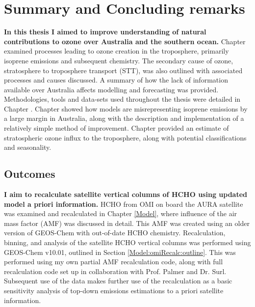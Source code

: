 \chapter{Summary and Concluding remarks} %
\label{Conclusions}

  \textbf{In this thesis I aimed to improve understanding of natural contributions to ozone over Australia and the southern ocean.}
  Chapter  examined processes leading to ozone creation in the troposphere, primarily isoprene emissions and subsequent chemistry.
  The secondary cause of ozone, stratosphere to troposphere transport (STT), was also outlined with associated processes and causes discussed.
  A summary of how the lack of information available over Australia affects modelling and forecasting was provided.
  Methodologies, tools and data-sets used throughout the thesis were detailed in Chapter .
  Chapter  showed how models are misrepresenting isoprene emissions by a large margin in Australia, along with the description and implementation of a relatively simple method of improvement.
  Chapter  provided an estimate of stratospheric ozone influx to the troposphere, along with potential classifications and seasonality.

\section{Outcomes}
\label{Conclusions:aims}
  
  \textbf{I aim to recalculate satellite vertical columns of HCHO using updated model a priori information.}
  HCHO from OMI on board the AURA satellite %
  was examined and recalculated in Chapter \ref{Model}, where influence of the air mass factor (AMF) was discussed in detail. %
  This AMF was created using an older version of GEOS-Chem with out-of-date HCHO chemistry.
  Recalculation, binning, and analysis of the satellite HCHO vertical columns was performed using GEOS-Chem v10.01, outlined in Section \ref{Model:omiRecalc:outline}.
  This was performed using my own partial AMF recalculation code, along with full recalculation code set up in collaboration with Prof. Palmer and Dr. Surl.
  Subsequent use of the data makes further use of the recalculation as a basic sensitivity analysis of top-down emissions estimations to a priori satellite information.
   
